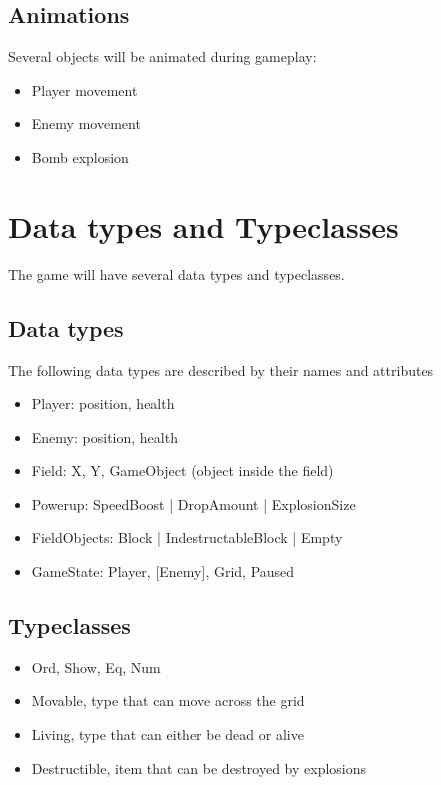 \documentclass[a4paper, 12]{article}
\begin{document}
		
		\subsection{Animations}
		Several objects will be animated during gameplay:
		\begin{itemize}
			\item Player movement
			\item Enemy movement
			\item Bomb explosion
		\end{itemize}	
		
		\section{Data types and Typeclasses}
		The game will have several data types and typeclasses.
	
		
		\subsection{Data types}
		The following data types are described by their names and attributes
			\begin{itemize}
				\item Player: position, health
				\item Enemy: position, health
				\item Field: X, Y, GameObject (object inside the field)
				\item Powerup: SpeedBoost | DropAmount | ExplosionSize
				\item FieldObjects: Block | IndestructableBlock | Empty
				\item GameState: Player, [Enemy], Grid, Paused
			\end{itemize}
				
		\subsection{Typeclasses}
			\begin{itemize}
				\item Ord, Show, Eq, Num
				\item Movable, type that can move across the grid
				\item Living, type that can either be dead or alive
				\item Destructible, item that can be destroyed by explosions
			\end{itemize}
		
		
\end{document}

